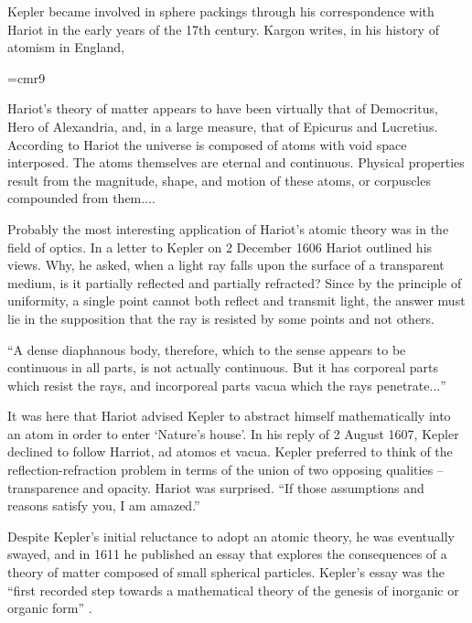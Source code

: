 Kepler 
became involved in sphere packings through his correspondence
with Hariot in the early years of the 17th century.
Kargon writes, in his history of atomism in England,


{
\narrower
\font\ninerm=cmr9
\ninerm

    Hariot's theory of matter appears to have been virtually that of Democritus,  Hero of Alexandria,  and, in a large measure, that of Epicurus
    and Lucretius. According to Hariot the universe is composed of atoms with void space interposed. The atoms themselves are eternal and
    continuous. Physical properties result from the magnitude, shape, and motion of these atoms, or corpuscles compounded from them$\ldots$.

    Probably the most interesting application of Hariot's atomic theory was in the field of optics. In a letter to Kepler on 2 December 1606
    Hariot outlined his views. Why, he asked, when a light ray falls upon the surface of a transparent medium, is it partially reflected and
    partially refracted? Since by the principle of uniformity, a single point cannot both reflect and transmit light, the answer must lie in the
    supposition that the ray is resisted by some points and not others.

    ``A dense diaphanous body, therefore, which to the sense appears to be continuous in all parts, is not actually continuous. But it has
    corporeal parts which resist the rays, and incorporeal parts vacua which the rays penetrate$\ldots$''

    It was here that Hariot advised Kepler to abstract himself mathematically into an atom in order to enter `Nature's house'. In his reply of 2
    August 1607, Kepler declined to follow Harriot, ad atomos et vacua. Kepler preferred to think of the reflection-refraction problem in terms
    of the union of two opposing qualities --
    transparence and opacity. Hariot was surprised. ``If those assumptions and reasons satisfy you, I
    am amazed.'' \cite[p.26]{Kar66}

}

\smallskip
Despite Kepler's initial reluctance to adopt an atomic theory, he
was eventually swayed, and in 1611 he published an essay that
explores the consequences of a theory of matter composed of small
spherical particles.  Kepler's essay was the ``first recorded step
towards a mathematical theory of the genesis of inorganic or
organic form'' \cite[p.v]{Why66}.

